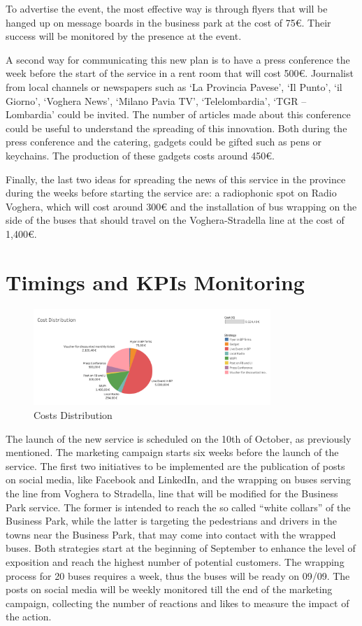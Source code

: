 To advertise the event, the most effective way is through flyers that will be hanged up on message boards in the business park at the cost of 75€. Their success will be monitored by the presence at the event. 

A second way for communicating this new plan is to have a press conference the week before the start of the service in a rent room that will cost 500€. Journalist from local channels or newspapers such as ‘La Provincia Pavese’, ‘Il Punto’, ‘il Giorno’, ‘Voghera News’, ‘Milano Pavia TV’, ‘Telelombardia’, ‘TGR – Lombardia’ could be invited. The number of articles made about this conference could be useful to understand the spreading of this innovation. Both during the press conference and the catering, gadgets could be gifted such as pens or keychains. The production of these gadgets costs around 450€.

Finally, the last two ideas for spreading the news of this service in the province during the weeks before starting the service are: a radiophonic spot on Radio Voghera, which will cost around 300€ and the installation of bus wrapping on the side of the buses that should travel on the Voghera-Stradella line at the cost of 1,400€.


\section{Timings and KPIs Monitoring}
\begin{figure}
    \centering
    \includegraphics[width=0.8\textwidth]{Images/merketing/cost_distribution.png}
    \caption{Costs Distribution}
    \label{fig:costdistribution}
\end{figure}

The launch of the new service is scheduled on the 10th of October, as previously mentioned. The marketing campaign starts six weeks before the launch of the service. The first two initiatives to be implemented are the publication of posts on social media, like Facebook and LinkedIn, and the wrapping on buses serving the line from Voghera to Stradella, line that will be modified for the Business Park service. The former is intended to reach the so called “white collars” of the Business Park, while the latter is targeting the pedestrians and drivers in the towns near the Business Park, that may come into contact with the wrapped buses. Both strategies start at the beginning of September to enhance the level of exposition and reach the highest number of potential customers. The wrapping process for 20 buses requires a week, thus the buses will be ready on 09/09. The posts on social media will be weekly monitored till the end of the marketing campaign, collecting the number of reactions and likes to measure the impact of the action.

